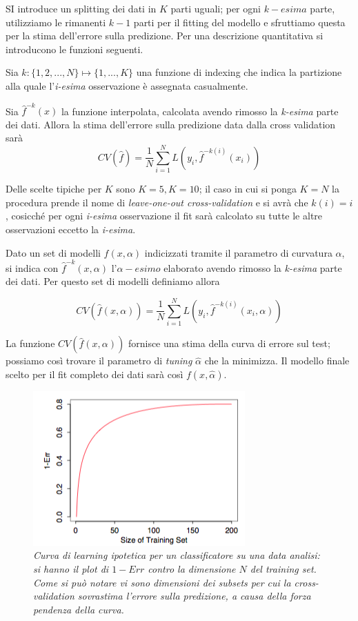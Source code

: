 \documentclass[12pt,openright,twoside,a4paper]{book}
\begin{document}
SI introduce un splitting dei dati in $K$ parti uguali; per ogni $k-esima$ parte, utilizziamo le rimanenti $k-1$ parti per il fitting del modello e sfruttiamo questa per la stima dell'errore sulla predizione.
Per una descrizione quantitativa si introducono le funzioni seguenti.

Sia $k:\{1,2,...,N\}\longmapsto\{1,...,K\}$ una funzione di indexing che indica la partizione alla quale l'\textit{i-esima} osservazione è assegnata casualmente.

Sia $\hat{f}^{-k}(x)$ la funzione interpolata, calcolata avendo rimosso la \textit{k-esima} parte dei dati.
Allora la stima dell'errore sulla predizione data dalla cross validation sarà
\begin{equation}
CV(\hat{f})=\frac{1}{N}\sum^{N}_{i=1}L(y_i,\hat{f}^{-k(i)}(x_i))
\end{equation}

Delle scelte tipiche per $K$ sono $K=5,K=10$; il caso in cui si ponga $K=N$ la procedura prende il nome di \textit{leave-one-out cross-validation} e si avrà che $k(i)=i$, cosicché per ogni \textit{i-esima} osservazione il fit sarà calcolato su tutte le altre osservazioni eccetto la \textit{i-esima}.

Dato un set di modelli $f(x,\alpha)$ indicizzati tramite il parametro di curvatura $\alpha$, si indica con $\hat{f}^{-k}(x,\alpha)$ l'$\alpha-esimo$ elaborato avendo rimosso la \textit{k-esima} parte dei dati.
Per questo set di modelli definiamo allora

\begin{equation}
CV(\hat{f}(x,\alpha))=\frac{1}{N}\sum^{N}_{i=1}L(y_i,\hat{f}^{-k(i)}(x_i,\alpha))
\end{equation}

La funzione $CV(\hat{f}(x,\alpha))$ fornisce una stima della curva di errore sul test; possiamo così trovare il parametro di \textit{tuning} $\hat{\alpha}$ che la minimizza. Il modello finale scelto per il fit completo dei dati sarà così $f(x,\hat{\alpha})$. \cite{ESL}

\begin{figure}[!h]
\centering
\includegraphics[width=0.5\linewidth]{LearningCurve}
\caption{\textit{Curva di learning ipotetica per un classificatore su una data analisi: si hanno il plot di $1-Err$ contro la dimensione $N$ del training set. Come si può notare vi sono dimensioni dei subsets per cui la cross-validation sovrastima l'errore sulla predizione, a causa della forza pendenza della curva. }}
\label{curve}
\end{figure}
\end{document}
